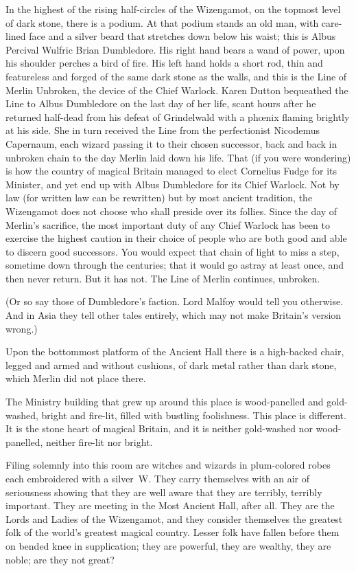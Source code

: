 In the highest of the rising half-circles of the Wizengamot, on the topmost level of dark stone, there is a podium. At that podium stands an old man, with care-lined face and a silver beard that stretches down below his waist; this is Albus Percival Wulfric Brian Dumbledore. His right hand bears a wand of power, upon his shoulder perches a bird of fire. His left hand holds a short rod, thin and featureless and forged of the same dark stone as the walls, and this is the Line of Merlin Unbroken, the device of the Chief Warlock. Karen Dutton bequeathed the Line to Albus Dumbledore on the last day of her life, scant hours after he returned half-dead from his defeat of Grindelwald with a phœnix flaming brightly at his side. She in turn received the Line from the perfectionist Nicodemus Capernaum, each wizard passing it to their chosen successor, back and back in unbroken chain to the day Merlin laid down his life. That (if you were wondering) is how the country of magical Britain managed to elect Cornelius Fudge for its Minister, and yet end up with Albus Dumbledore for its Chief Warlock. Not by law (for written law can be rewritten) but by most ancient tradition, the Wizengamot does not choose who shall preside over its follies. Since the day of Merlin's sacrifice, the most important duty of any Chief Warlock has been to exercise the highest caution in their choice of people who are both good and able to discern good successors. You would expect that chain of light to miss a step, sometime down through the centuries; that it would go astray at least once, and then never return. But it has not. The Line of Merlin continues, unbroken.

(Or so say those of Dumbledore's faction. Lord Malfoy would tell you otherwise. And in Asia they tell other tales entirely, which may not make Britain's version wrong.)

Upon the bottommost platform of the Ancient Hall there is a high-backed chair, legged and armed and without cushions, of dark metal rather than dark stone, which Merlin did not place there.

The Ministry building that grew up around this place is wood-panelled and gold-washed, bright and fire-lit, filled with bustling foolishness. This place is different. It is the stone heart of magical Britain, and it is neither gold-washed nor wood-panelled, neither fire-lit nor bright.

Filing solemnly into this room are witches and wizards in plum-colored robes each embroidered with a silver~W\@. They carry themselves with an air of seriousness showing that they are well aware that they are terribly, terribly important. They are meeting in the Most Ancient Hall, after all. They are the Lords and Ladies of the Wizengamot, and they consider themselves the greatest folk of the world's greatest magical country. Lesser folk have fallen before them on bended knee in supplication; they are powerful, they are wealthy, they are noble; are they not great?

